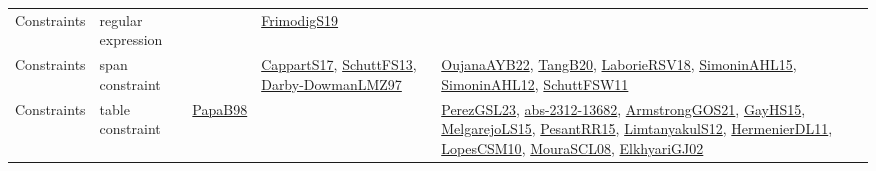 {\begin{longtable}{llp{6cm}p{6cm}p{6cm}}
Constraints & regular expression &  & \href{papers/FrimodigS19.pdf}{FrimodigS19}\cite{FrimodigS19} & \\
Constraints & span constraint &  & \href{papers/CappartS17.pdf}{CappartS17}\cite{CappartS17}, \href{papers/SchuttFS13.pdf}{SchuttFS13}\cite{SchuttFS13}, \href{articles/Darby-DowmanLMZ97.pdf}{Darby-DowmanLMZ97}\cite{Darby-DowmanLMZ97} & \href{papers/OujanaAYB22.pdf}{OujanaAYB22}\cite{OujanaAYB22}, \href{papers/TangB20.pdf}{TangB20}\cite{TangB20}, \href{articles/LaborieRSV18.pdf}{LaborieRSV18}\cite{LaborieRSV18}, \href{articles/SimoninAHL15.pdf}{SimoninAHL15}\cite{SimoninAHL15}, \href{papers/SimoninAHL12.pdf}{SimoninAHL12}\cite{SimoninAHL12}, \href{articles/SchuttFSW11.pdf}{SchuttFSW11}\cite{SchuttFSW11}\\
Constraints & table constraint & \href{articles/PapaB98.pdf}{PapaB98}\cite{PapaB98} &  & \href{papers/PerezGSL23.pdf}{PerezGSL23}\cite{PerezGSL23}, \href{articles/abs-2312-13682.pdf}{abs-2312-13682}\cite{abs-2312-13682}, \href{papers/ArmstrongGOS21.pdf}{ArmstrongGOS21}\cite{ArmstrongGOS21}, \href{papers/GayHS15.pdf}{GayHS15}\cite{GayHS15}, \href{papers/MelgarejoLS15.pdf}{MelgarejoLS15}\cite{MelgarejoLS15}, \href{papers/PesantRR15.pdf}{PesantRR15}\cite{PesantRR15}, \href{articles/LimtanyakulS12.pdf}{LimtanyakulS12}\cite{LimtanyakulS12}, \href{papers/HermenierDL11.pdf}{HermenierDL11}\cite{HermenierDL11}, \href{articles/LopesCSM10.pdf}{LopesCSM10}\cite{LopesCSM10}, \href{papers/MouraSCL08.pdf}{MouraSCL08}\cite{MouraSCL08}, \href{papers/ElkhyariGJ02.pdf}{ElkhyariGJ02}\cite{ElkhyariGJ02}\\

\end{longtable}}
